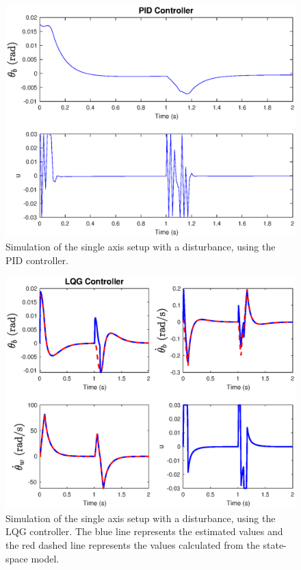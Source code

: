 \begin{figure}[h]
    \centering
    \includegraphics[width=\linewidth]{figures/PID.eps}
    \caption{Simulation of the single axis setup with a disturbance, using the PID controller.}
    \label{fig:PIDGraph}
\end{figure}

\begin{figure}[h]
    \centering
    \includegraphics[width=\linewidth]{figures/LQG.eps}
    \caption{Simulation of the single axis setup with a disturbance, using the LQG controller. The blue line represents the estimated values and the red dashed line represents the values calculated from the state-space model.}
    \label{fig:LQGGraph}
\end{figure}

